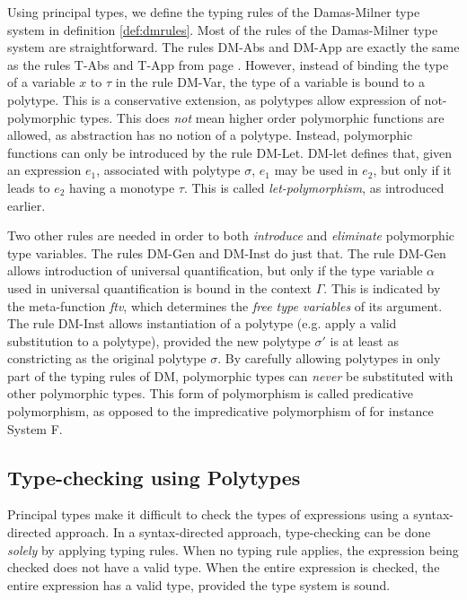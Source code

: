 Using principal types, we define the typing rules of the Damas-Milner type system in definition \ref{def:dmrules}.
Most of the rules of the Damas-Milner type system are straightforward.
The rules DM-Abs and DM-App are exactly the same as the rules T-Abs and T-App from page \pageref{def:typerulelambda}.
However, instead of binding the type of a variable $x$ to $\tau$ in the rule DM-Var, the type of a variable is bound to a polytype.
This is a conservative extension, as polytypes allow expression of not-polymorphic types.
This does \textit{not} mean higher order polymorphic functions are allowed, as abstraction has no notion of a polytype.
Instead, polymorphic functions can only be introduced by the rule DM-Let.
DM-let defines that, given an expression $e_1$, associated with polytype $\sigma$, $e_1$ may be used in $e_2$, but only if it leads to $e_2$ having a monotype $\tau$.
This is called \textit{let-polymorphism}, as introduced earlier.

Two other rules are needed in order to both \textit{introduce} and \textit{eliminate} polymorphic type variables.
The rules DM-Gen and DM-Inst do just that.
The rule DM-Gen allows introduction of universal quantification, but only if the type variable $\alpha$ used in universal quantification is bound in the context $\Gamma$. 
This is indicated by the meta-function \textit{ftv}, which determines the \textit{free type variables} of its argument.
The rule DM-Inst allows instantiation of a polytype (e.g. apply a valid substitution to a polytype), provided the new polytype $\sigma'$ is at least as constricting as the original polytype $\sigma$.
By carefully allowing polytypes in only part of the typing rules of DM, polymorphic types can \textit{never} be substituted with other polymorphic types\cite{pierce2002types}.
This form of polymorphism is called predicative polymorphism, as opposed to the impredicative polymorphism of for instance System F\cite{girard1971extension}.


\subsection{Type-checking using Polytypes}
Principal types make it difficult to check the types of expressions using a syntax-directed approach.
In a syntax-directed approach, type-checking can be done \textit{solely} by applying typing rules.
When no typing rule applies, the expression being checked does not have a valid type.
When the entire expression is checked, the entire expression has a valid type, provided the type system is sound.

